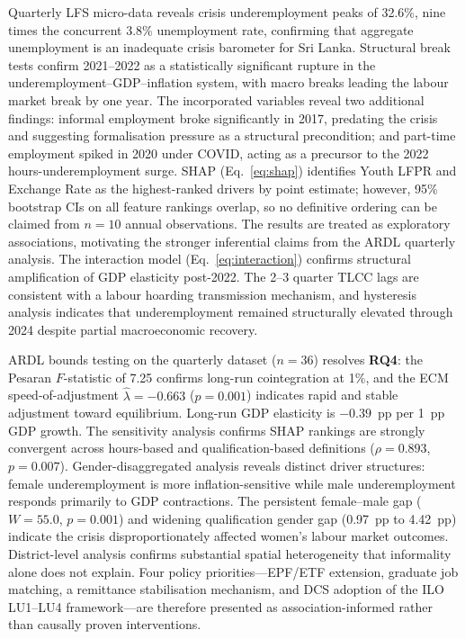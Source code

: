 \documentclass[sigconf]{acmart}
\begin{document}
Quarterly LFS micro-data reveals crisis underemployment peaks of 32.6\%,
nine times the concurrent 3.8\% unemployment rate, confirming that
aggregate unemployment is an inadequate crisis barometer for Sri Lanka.
Structural break tests confirm 2021--2022 as a statistically significant
rupture in the underemployment--GDP--inflation system, with macro breaks
leading the labour market break by one year. The incorporated variables
reveal two additional findings: informal employment broke significantly
in 2017, predating the crisis and suggesting formalisation pressure as
a structural precondition; and part-time employment spiked in 2020
under COVID, acting as a precursor to the 2022 hours-underemployment
surge. SHAP (Eq.~\ref{eq:shap}) identifies Youth LFPR and Exchange Rate
as the highest-ranked drivers by point estimate; however, 95\% bootstrap
CIs on all feature rankings overlap, so no definitive ordering can be
claimed from $n{=}10$ annual observations. The results are treated as
exploratory associations, motivating the stronger inferential claims from
the ARDL quarterly analysis. The interaction model (Eq.~\ref{eq:interaction})
confirms structural amplification of GDP elasticity post-2022. The 2--3
quarter TLCC lags are consistent with a labour hoarding transmission
mechanism, and hysteresis analysis indicates that underemployment remained
structurally elevated through 2024 despite partial macroeconomic recovery.
 
ARDL bounds testing on the quarterly dataset ($n{=}36$) resolves
\textbf{RQ4}: the Pesaran $F$-statistic of 7.25 confirms long-run
cointegration at 1\%, and the ECM speed-of-adjustment
$\hat\lambda{=}{-}0.663$ ($p{=}0.001$) indicates rapid and stable
adjustment toward equilibrium.
Long-run GDP elasticity is $-0.39$~pp
per 1~pp GDP growth. The sensitivity analysis confirms SHAP rankings
are strongly convergent across hours-based and qualification-based
definitions ($\rho = 0.893$, $p = 0.007$). Gender-disaggregated
analysis reveals distinct driver structures: female underemployment is
more inflation-sensitive while male underemployment responds primarily
to GDP contractions. The persistent female--male gap ($W = 55.0$,
$p = 0.001$) and widening qualification gender gap (0.97~pp to 4.42~pp)
indicate the crisis disproportionately affected women's labour market
outcomes. District-level analysis confirms substantial spatial
heterogeneity that informality alone does not explain. Four policy
priorities---EPF/ETF extension, graduate job matching, a remittance
stabilisation mechanism, and DCS adoption of the ILO LU1--LU4
framework---are therefore presented as association-informed rather than
causally proven interventions.
 
\end{document}
